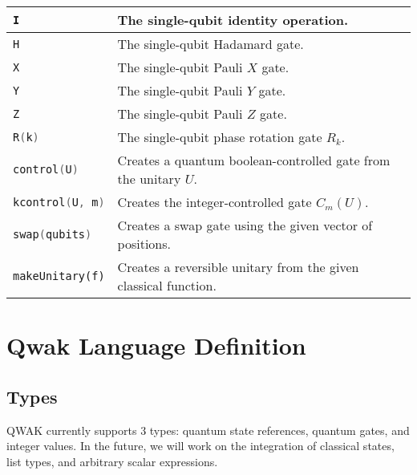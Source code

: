 \documentclass{article}
\begin{document}
\begin{center}
\begin{tabular}{| l | l |}
\hline
\lstinline$I$ & The single-qubit identity operation. \\ \hline
\lstinline$H$ & The single-qubit Hadamard gate. \\ \hline
\lstinline$X$ & The single-qubit Pauli $X$ gate. \\ \hline
\lstinline$Y$ & The single-qubit Pauli $Y$ gate. \\ \hline
\lstinline$Z$ & The single-qubit Pauli $Z$ gate. \\ \hline
\lstinline[language=C]$R(k)$ & The single-qubit phase rotation gate $R_k$. \\ \hline
\lstinline[language=C]$control(U)$ & Creates a quantum boolean-controlled gate from the unitary $U$. \\ \hline
\lstinline[language=C]$kcontrol(U, m)$ & Creates the integer-controlled gate $C_m(U)$. \\ \hline
\lstinline[language=C]$swap(qubits)$ & Creates a swap gate using the given vector of positions. \\ \hline
\lstinline$makeUnitary(f)$ & Creates a reversible unitary from the given classical function. \\ \hline

\end{tabular}
\end{center}

\pagebreak

\section{Qwak Language Definition}
\label{sec:langdef}

\subsection{Types}

QWAK currently supports 3 types: quantum state references, quantum gates, and integer values. In the future, we will work on the integration of classical states, list types, and arbitrary scalar expressions.
\end{document}
